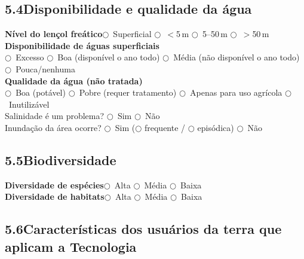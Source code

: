 \subsection{5.4\quad Disponibilidade e qualidade da água}

\noindent\textbf{Nível do lençol freático}\quad $\bigcirc$~Superficial \quad $\bigcirc$~$<$5\,m \quad $\bigcirc$~5--50\,m \quad $\bigcirc$~$>$50\,m\\[4pt]
\textbf{Disponibilidade de águas superficiais}\\
$\bigcirc$~Excesso \quad $\bigcirc$~Boa (disponível o ano todo) \quad $\bigcirc$~Média (não disponível o ano todo) \quad $\bigcirc$~Pouca/nenhuma\\[4pt]
\textbf{Qualidade da água (não tratada)}\\
$\bigcirc$~Boa (potável) \quad $\bigcirc$~Pobre (requer tratamento) \quad $\bigcirc$~Apenas para uso agrícola \quad $\bigcirc$~Inutilizável\\[4pt]
Salinidade é um problema? $\bigcirc$~Sim \quad $\bigcirc$~Não\\
Inundação da área ocorre? $\bigcirc$~Sim ($\bigcirc$ frequente / $\bigcirc$ episódica) \quad $\bigcirc$~Não

\subsection{5.5\quad Biodiversidade}

\textbf{Diversidade de espécies}\quad $\bigcirc$~Alta \quad $\bigcirc$~Média \quad $\bigcirc$~Baixa\\
\textbf{Diversidade de habitats}\quad $\bigcirc$~Alta \quad $\bigcirc$~Média \quad $\bigcirc$~Baixa

\subsection{5.6\quad Características dos usuários da terra que aplicam a Tecnologia}

